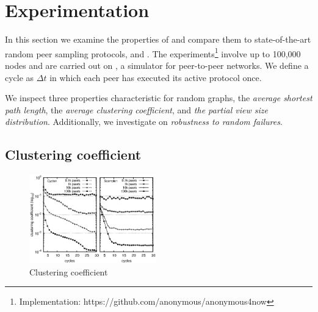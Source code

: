 
\section{Experimentation}
\label{sec:experiments}
In this section we examine the properties of \SCAMPLON{} and 
compare them to state-of-the-art random peer sampling protocols, \SCAMP{} and \CYCLON{}. 
The experiments\footnote{Implementation: https://github.com/anonymous/anonymous4now}
involve up to 100,000 nodes and are carried out on \PEERSIM{} \cite{peersim}, 
a simulator for peer-to-peer networks.
We define a cycle as $\Delta t$ in which each peer has executed its active protocol once.

We inspect three properties characteristic for random graphs, 
the \emph{average shortest path length}, the \emph{average clustering coefficient},
and \emph{the partial view size distribution}. Additionally, we investigate on
\emph{robustness to random failures}.

\subsection{Clustering coefficient}

\begin{figure}
    \centering
    \includegraphics[width=0.49\textwidth]{img/cluster.eps}
    \caption{Clustering coefficient}
    \label{fig:clustering}
\end{figure}


